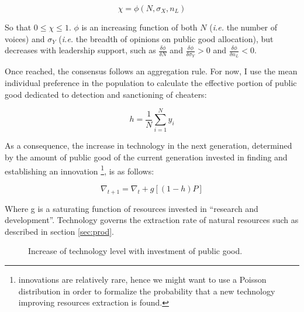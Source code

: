 \documentclass[a4paper]{article}
\begin{document}
\begin{equation}
\chi = \phi\left(N,\sigma_X,n_L\right)
\end{equation}  

So that $0\leq\chi\leq1$. $\phi$ is an increasing function of both $N$ (\textit{i.e.} the number of voices) and $\sigma_Y$ (\textit{i.e.} the breadth of opinions on public good allocation), but decreases with leadership support, such as $\frac{\delta \phi}{\delta N}$ and $\frac{\delta \phi}{\delta \sigma_Y} > 0$ and $\frac{\delta \phi}{\delta n_L} < 0$.

Once reached, the consensus follows an aggregation rule. For now, I use the mean individual preference in the population to calculate the effective portion of public good dedicated to detection and sanctioning of cheaters:

\begin{equation}
h=\frac{1}{N} \sum_{i=1}^{N}y_i
\end{equation}

As a consequence, the increase in technology in the next generation, determined by the amount of public good of the current generation invested in finding and establishing an innovation \footnote{innovations are relatively rare, hence we might want to use a Poisson distribution in order to formalize the probability that a new technology improving resources extraction is found.}, is as follows:

\begin{equation}
\nabla_{t+1}=\nabla_t + g\left[\left(1-h\right)P\right]
\end{equation}

Where g is a saturating function of resources invested in ``research and development''. Technology governs the extraction rate of natural resources such as described in section \ref{sec:prod}.

\begin{figure}[!htbp]
	\begin{center}
	\end{center}
	\caption{Increase of technology level with investment of public good.}
	\label{fig:techfunc}
\end{figure} 
\end{document}
